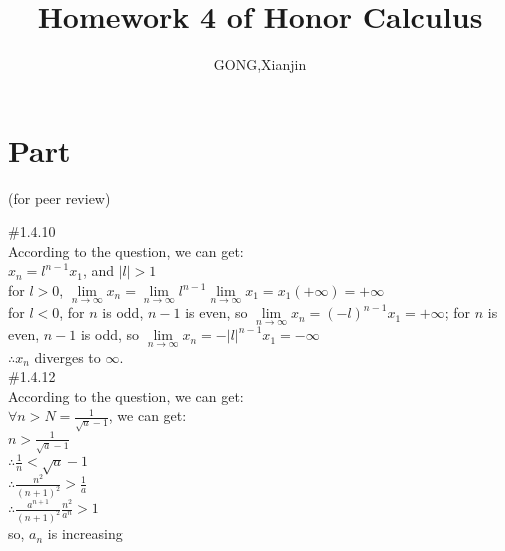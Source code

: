 \documentclass{article}
\author{GONG,Xianjin}
\title{Homework 4 of Honor Calculus}
\begin{document}
\maketitle

\section{\textcolor[rgb]{0.70,0.00,0.00}{Part \uppercase\expandafter{}}}(for peer review)

\vspace{3.5mm}

\textcolor[rgb]{0.00,0.00,0.50}{\#1.4.10}\\

According to the question, we can get:\\

$x_n=l^{n-1}x_1$, and $|l|>1$\\

for $l>0$, $\lim \limits_{n \to \infty}x_n=\lim \limits_{n \to \infty}l^{n-1}\lim \limits_{n \to \infty}x_1=x_1(+\infty)=+\infty$\\

for $l<0$, for $n$ is odd, $n-1$ is even, so $\lim \limits_{n \to \infty}x_n=(-l)^{n-1}x_1=+\infty$; for $n$ is even, $n-1$ is odd, so $\lim \limits_{n \to \infty}x_n=-|l|^{n-1}x_1=-\infty$\\

$\therefore$\qquad$x_n$ diverges to $\infty$.\\

\textcolor[rgb]{0.00,0.00,0.50}{\#1.4.12}\\

According to the question, we can get:\\

$\forall n>N=\displaystyle\frac{1}{\sqrt{a}-1}$, we can get:\\

$n>\displaystyle\frac{1}{\sqrt{a}-1}$\\

$\therefore$\qquad$\displaystyle\frac{1}{n}<\sqrt{a}-1$\\

$\therefore$\qquad$\displaystyle\frac{n^2}{(n+1)^2}>\frac{1}{a}$\\

$\therefore$\qquad$\displaystyle\frac{a^{n+1}}{(n+1)^2}\frac{n^2}{a^n}>1$\\

so, $a_n$ is increasing\\
\end{document}
